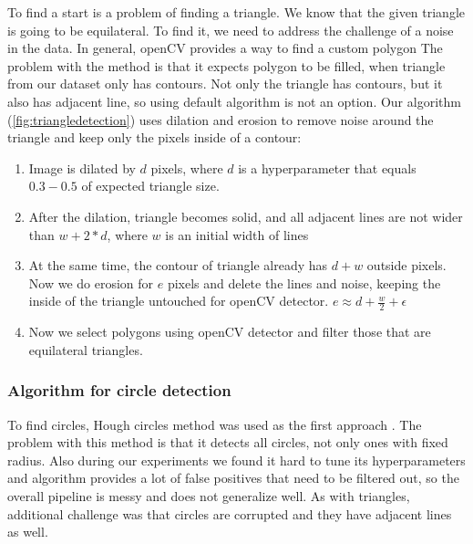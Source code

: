 \documentclass[a4paper,12pt]{extarticle}
\begin{document}
To find a start is a problem of finding a triangle.
We know that the given triangle is going to be equilateral.
To find it, we need to address the challenge of a noise in the data.
In general, openCV provides a way to find a custom polygon \cite{findcontours}
The problem with the method is that it expects polygon to be filled, when triangle from our dataset only has contours.
Not only the triangle has contours, but it also has adjacent line, so using default algorithm is not an option.
Our algorithm (\cref{fig:triangledetection}) uses dilation and erosion to remove noise around the triangle and keep only the pixels inside of a contour:
\begin{enumerate}
    \item Image is dilated by $d$ pixels, where $d$ is a hyperparameter that equals $0.3-0.5$ of expected triangle size.
    \item After the dilation, triangle becomes solid, and all adjacent lines are not wider than $w + 2 * d$, where $w$ is an initial width of lines
    \item At the same time, the contour of triangle already has $d + w$ outside pixels. Now we do erosion for $e$ pixels and delete the lines and noise, keeping the inside of the triangle untouched for openCV detector. $e \approx d + \frac{w}{2} + \epsilon$
    \item Now we select polygons using openCV detector and filter those that are equilateral triangles.
\end{enumerate}

\subsubsection{Algorithm for circle detection}

To find circles, Hough circles method was used as the first approach \cite{houghcircles}.
The problem with this method is that it detects all circles, not only ones with fixed radius.
Also during our experiments we found it hard to tune its hyperparameters and algorithm provides a lot of false positives that need to be filtered out, so the overall pipeline is messy and does not generalize well.
As with triangles, additional challenge was that circles are corrupted and they have adjacent lines as well.
\end{document}

